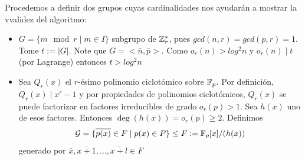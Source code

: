 \documentclass{article}
\begin{document}
Procedemos a definir dos grupos cuyas cardinalidades nos ayudarán a mostrar la vvalidez del algoritmo:
\begin{itemize}
    \item $G=\{m \mod r \mid m \in I\}$ subgrupo de $\mathbb{Z}_r^*$, pues $gcd(n,r)=gcd(p,r)=1$. Tome $t:=|G|$. Note que $G=<\overline{n},\overline{p}>$. Como $o_r(n)>log^2 n$ y $o_r(n)\mid t$ (por Lagrange) entonces $t>log^2 n$   
    \item Sea $Q_r(x)$ el $r$-ésimo polinomio ciclotómico sobre $\mathbb{F}_p$. Por definición, $Q_r(x)\mid x^r-1$ y por propiedades de polinomios ciclotómicos, $Q_r(x)$ se puede factorizar en factores irreducibles de grado $o_r(p)>1$. Sea $h(x)$ uno de esos factores. Entonces $\deg(h(x))=o_r(p)\geq 2$. Definimos 
    \begin{align}
        \mathcal{G}=\{\overline{p(x)}\in F \mid p(x)\in P\} \leq F := \mathbb{F}_p[x]/(h(x))
    \end{align}
    generado por $\overline{x}, \overline{x+1}, \dots, \overline{x+l}\in F$
\end{itemize}
\end{document}
